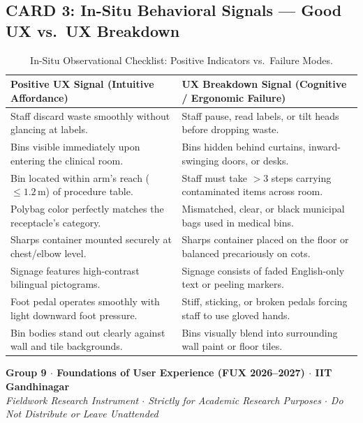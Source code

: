 \documentclass[11pt,a4paper]{article}
\begin{document}
\subsection{CARD 3: In-Situ Behavioral Signals --- Good UX vs.\ UX Breakdown}
\begin{table}[h!]
\centering
\small
\renewcommand{\arraystretch}{1.2}
\begin{tabularx}{\textwidth}{p{7.5cm}X}
\toprule
\rowcolor{iitblue}
\color{white}\textbf{Positive UX Signal (Intuitive Affordance)} & \color{white}\textbf{UX Breakdown Signal (Cognitive / Ergonomic Failure)} \\
\midrule
Staff discard waste smoothly without glancing at labels. & Staff pause, read labels, or tilt heads before dropping waste. \\
\rowcolor{softgray}
Bins visible immediately upon entering the clinical room. & Bins hidden behind curtains, inward-swinging doors, or desks. \\
Bin located within arm's reach ($\le 1.2$\,m) of procedure table. & Staff must take $>3$ steps carrying contaminated items across room. \\
\rowcolor{softgray}
Polybag color perfectly matches the receptacle's category. & Mismatched, clear, or black municipal bags used in medical bins. \\
Sharps container mounted securely at chest/elbow level. & Sharps container placed on the floor or balanced precariously on cots. \\
\rowcolor{softgray}
Signage features high-contrast bilingual pictograms. & Signage consists of faded English-only text or peeling markers. \\
Foot pedal operates smoothly with light downward foot pressure. & Stiff, sticking, or broken pedals forcing staff to use gloved hands. \\
\rowcolor{softgray}
Bin bodies stand out clearly against wall and tile backgrounds. & Bins visually blend into surrounding wall paint or floor tiles. \\
\bottomrule
\end{tabularx}
\caption{In-Situ Observational Checklist: Positive Indicators vs.\ Failure Modes.}
\end{table}

\vfill
\begin{center}
    \footnotesize\color{darkcharcoal}
    \textbf{Group 9 $\cdot$ Foundations of User Experience (FUX 2026--2027) $\cdot$ IIT Gandhinagar}\\
    \emph{Fieldwork Research Instrument $\cdot$ Strictly for Academic Research Purposes $\cdot$ Do Not Distribute or Leave Unattended}
\end{center}
\end{document}
